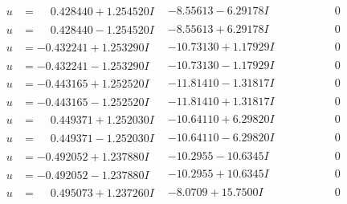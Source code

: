 \documentclass[1p]{elsarticle_modified}
\theoremstyle{definition}
\begin{document}
$$\begin{array}{c|c|c}
\begin{aligned}
u &= \phantom{-}0.428440 + 1.254520 I\end{aligned}
 & -8.55613 - 6.29178 I & \phantom{-0.000000 } 0 \\ \hline\begin{aligned}
u &= \phantom{-}0.428440 - 1.254520 I\end{aligned}
 & -8.55613 + 6.29178 I & \phantom{-0.000000 } 0 \\ \hline\begin{aligned}
u &= -0.432241 + 1.253290 I\end{aligned}
 & -10.73130 + 1.17929 I & \phantom{-0.000000 } 0 \\ \hline\begin{aligned}
u &= -0.432241 - 1.253290 I\end{aligned}
 & -10.73130 - 1.17929 I & \phantom{-0.000000 } 0 \\ \hline\begin{aligned}
u &= -0.443165 + 1.252520 I\end{aligned}
 & -11.81410 - 1.31817 I & \phantom{-0.000000 } 0 \\ \hline\begin{aligned}
u &= -0.443165 - 1.252520 I\end{aligned}
 & -11.81410 + 1.31817 I & \phantom{-0.000000 } 0 \\ \hline\begin{aligned}
u &= \phantom{-}0.449371 + 1.252030 I\end{aligned}
 & -10.64110 + 6.29820 I & \phantom{-0.000000 } 0 \\ \hline\begin{aligned}
u &= \phantom{-}0.449371 - 1.252030 I\end{aligned}
 & -10.64110 - 6.29820 I & \phantom{-0.000000 } 0 \\ \hline\begin{aligned}
u &= -0.492052 + 1.237880 I\end{aligned}
 & -10.2955 - 10.6345 I & \phantom{-0.000000 } 0 \\ \hline\begin{aligned}
u &= -0.492052 - 1.237880 I\end{aligned}
 & -10.2955 + 10.6345 I & \phantom{-0.000000 } 0 \\ \hline\begin{aligned}
u &= \phantom{-}0.495073 + 1.237260 I\end{aligned}
 & -8.0709 + 15.7500 I & \phantom{-0.000000 } 0 \\ \hline\begin{aligned}

\end{aligned}
\end{array}$$
\end{document}
